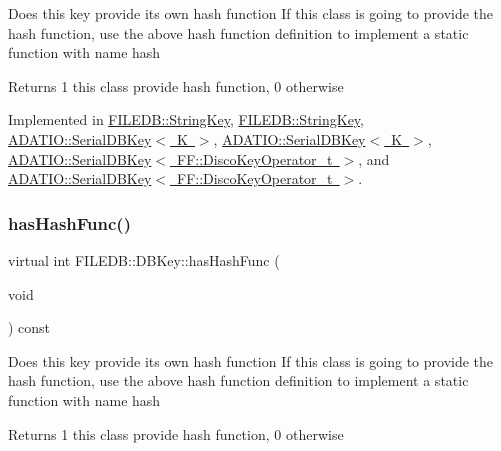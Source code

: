 Does this key provide its own hash function If this class is going to provide the hash function, use the above hash function definition to implement a static function with name hash

\begin{DoxyReturn}{Returns}
1 this class provide hash function, 0 otherwise 
\end{DoxyReturn}


Implemented in \mbox{\hyperlink{classFILEDB_1_1StringKey_afb2fa99d53c0f4b5aeca0377228ea722}{F\+I\+L\+E\+D\+B\+::\+String\+Key}}, \mbox{\hyperlink{classFILEDB_1_1StringKey_afb2fa99d53c0f4b5aeca0377228ea722}{F\+I\+L\+E\+D\+B\+::\+String\+Key}}, \mbox{\hyperlink{classADATIO_1_1SerialDBKey_ae8926cd9bdef006f3729f4b724a2e2fe}{A\+D\+A\+T\+I\+O\+::\+Serial\+D\+B\+Key$<$ K $>$}}, \mbox{\hyperlink{classADATIO_1_1SerialDBKey_ae8926cd9bdef006f3729f4b724a2e2fe}{A\+D\+A\+T\+I\+O\+::\+Serial\+D\+B\+Key$<$ K $>$}}, \mbox{\hyperlink{classADATIO_1_1SerialDBKey_ae8926cd9bdef006f3729f4b724a2e2fe}{A\+D\+A\+T\+I\+O\+::\+Serial\+D\+B\+Key$<$ F\+F\+::\+Disco\+Key\+Operator\+\_\+t $>$}}, and \mbox{\hyperlink{classADATIO_1_1SerialDBKey_ae8926cd9bdef006f3729f4b724a2e2fe}{A\+D\+A\+T\+I\+O\+::\+Serial\+D\+B\+Key$<$ F\+F\+::\+Disco\+Key\+Operator\+\_\+t $>$}}.

\mbox{\label{classFILEDB_1_1DBKey_a541dab4f4083ae951dee2f30483eb18e}} 
\subsubsection{\texorpdfstring{hasHashFunc()}{hasHashFunc()}\hspace{0.1cm}{\footnotesize\ttfamily [2/2]}}
{\footnotesize\ttfamily virtual int F\+I\+L\+E\+D\+B\+::\+D\+B\+Key\+::has\+Hash\+Func (\begin{DoxyParamCaption}\item[{void}]{ }\end{DoxyParamCaption}) const\hspace{0.3cm}{\ttfamily [pure virtual]}}

Does this key provide its own hash function If this class is going to provide the hash function, use the above hash function definition to implement a static function with name hash

\begin{DoxyReturn}{Returns}
1 this class provide hash function, 0 otherwise 
\end{DoxyReturn}


